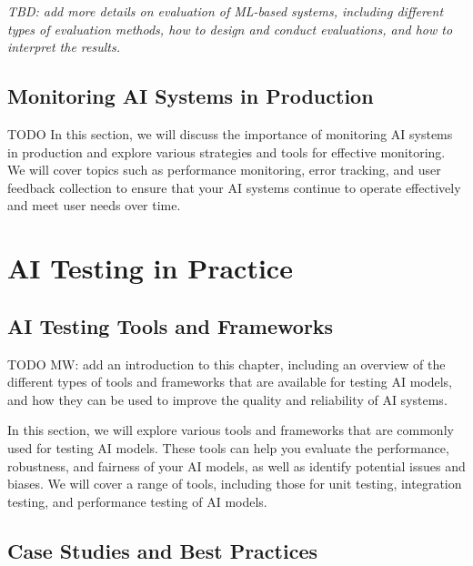 \documentclass[
  letterpaper,
  DIV=11,
  numbers=noendperiod,
  oneside]{scrreprt}
\begin{document}
\begin{tcolorbox}
\emph{TBD: add more details on evaluation of ML-based systems, including
different types of evaluation methods, how to design and conduct
evaluations, and how to interpret the results.}

\chapter{}\label{section-1}

\chapter{Monitoring AI Systems in
Production}\label{monitoring-ai-systems-in-production}

TODO In this section, we will discuss the importance of monitoring AI
systems in production and explore various strategies and tools for
effective monitoring. We will cover topics such as performance
monitoring, error tracking, and user feedback collection to ensure that
your AI systems continue to operate effectively and meet user needs over
time.

\part{AI Testing in Practice}

\chapter{AI Testing Tools and
Frameworks}\label{ai-testing-tools-and-frameworks}

TODO MW: add an introduction to this chapter, including an overview of
the different types of tools and frameworks that are available for
testing AI models, and how they can be used to improve the quality and
reliability of AI systems.

In this section, we will explore various tools and frameworks that are
commonly used for testing AI models. These tools can help you evaluate
the performance, robustness, and fairness of your AI models, as well as
identify potential issues and biases. We will cover a range of tools,
including those for unit testing, integration testing, and performance
testing of AI models.

\chapter{Case Studies and Best
Practices}\label{case-studies-and-best-practices}


\end{tcolorbox}
\end{document}
